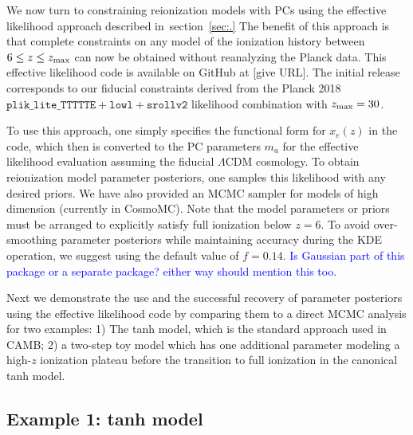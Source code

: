 \documentclass[prd,twocolumn,amsmath,amssymb,floatfix,superscriptaddress,nofootinbib]{revtex4-1}
\newcommand{\refsec}[1]{section~\ref{sec:#1}}
\newcommand{\zmax}{z_{\rm max}}
\newcommand{\wh}[1]{\textcolor{blue}{#1}}
\begin{document}
We now turn to constraining reionization models with PCs using the
effective likelihood approach described in~\refsec.  The benefit of this approach is that
complete constraints on any model of the ionization history  between $6 \leq z \leq \zmax$ can now be obtained without reanalyzing the Planck data. 
This effective likelihood code is available on GitHub at \url{} [give URL]. The initial release corresponds to our fiducial constraints derived from the Planck 2018 $\texttt{plik\_lite\_TTTTTE} + \texttt{lowl} + \texttt{srollv2}$ likelihood combination with $\zmax = 30$. 

To use this approach, one simply specifies the functional form for $x_e(z)$ in the code, which then is converted to the PC parameters $m_a$ for the effective likelihood evaluation assuming the fiducial $\Lambda$CDM cosmology.   
To obtain reionization model parameter posteriors, one samples this likelihood with any desired priors.   
We have also provided an MCMC sampler for models of high dimension (currently in CosmoMC). Note that the model parameters or priors must be arranged to explicitly satisfy 
full ionization below $z=6$. To avoid over-smoothing parameter posteriors while maintaining accuracy during the KDE operation, we suggest using the default value of $f = 0.14$. \wh{Is Gaussian part of this package or a separate package? either way should mention this too.}

Next we demonstrate the use and the successful recovery of parameter posteriors using the effective likelihood code by comparing them to a direct MCMC analysis for two examples: 1) The tanh model, which is the standard approach used in CAMB; 2) a two-step toy model which has one additional parameter modeling a high-$z$ ionization plateau before the transition to full ionization in the canonical tanh model.

\subsection{Example 1: tanh model}
\label{sec:example1}
\end{document}
